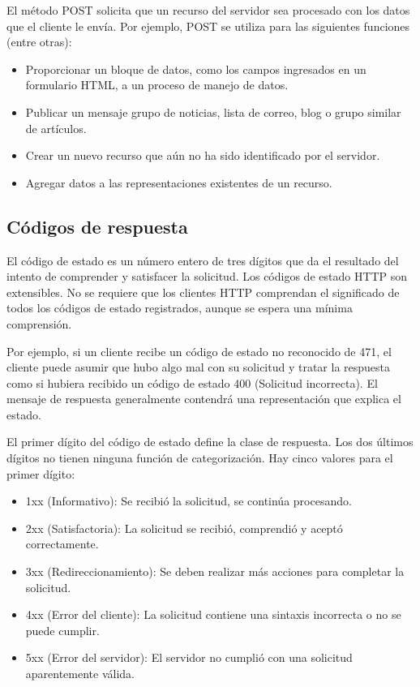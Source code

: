 El método POST solicita que un recurso del servidor sea procesado con 
los datos que el cliente le envía. Por ejemplo, POST se utiliza para 
las siguientes funciones (entre otras):

\begin{itemize}
   \setlength\itemsep{-0.6em}
   \item Proporcionar un bloque de datos, como los campos ingresados 
   en un formulario HTML, a un proceso de manejo de datos.
   \item Publicar un mensaje grupo de 
   noticias, lista de correo, blog o grupo similar de artículos.
   \item Crear un nuevo recurso que aún no ha sido identificado por 
   el servidor.
   \item Agregar datos a las representaciones existentes de un recurso.
\end{itemize}


\subsection{Códigos de respuesta} 
El código de estado es un número entero de tres dígitos que da el 
resultado del intento de comprender y satisfacer la solicitud.
   Los códigos de estado HTTP son extensibles. No se requiere que los
    clientes HTTP comprendan el significado de todos los códigos de
     estado registrados, aunque se espera una mínima comprensión.

   Por ejemplo, si un cliente recibe un código de estado no reconocido
    de 471, el cliente puede asumir que hubo algo mal con su solicitud
     y tratar la respuesta como si hubiera recibido un código de estado
      400 (Solicitud incorrecta). El mensaje de respuesta generalmente 
      contendrá una representación que explica el estado.

   El primer dígito del código de estado define la clase de respuesta.
    Los dos últimos dígitos no tienen ninguna función de categorización.
     Hay cinco valores para el primer dígito:

   \begin{itemize}
      \setlength\itemsep{-0.6em}
      \item 1xx (Informativo): Se recibió la solicitud, se continúa procesando.
      \item 2xx (Satisfactoria): La solicitud se recibió, comprendió y 
      aceptó correctamente.
      \item 3xx (Redireccionamiento): Se deben realizar más acciones para
    completar la solicitud.
    \item 4xx (Error del cliente): La solicitud contiene una sintaxis
    incorrecta o no se puede cumplir.
    \item 5xx (Error del servidor): El servidor no cumplió con una
       solicitud aparentemente válida.
   \end{itemize}

